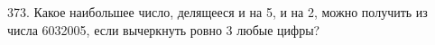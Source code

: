 373. Какое наибольшее число, делящееся и на 5, и на 2, можно получить из числа 6032005, если
вычеркнуть ровно 3 любые цифры?\\
